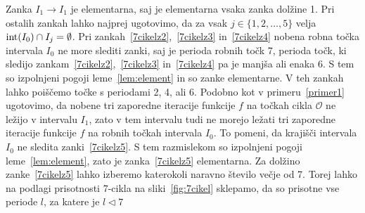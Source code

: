 \documentclass[../TG_magistrsko_delo_sections.tex]{subfiles}
\begin{document}
\begin{primer}[7-cikel]
Zanka $I_1 \to I_1$ je elementarna, saj je elementarna vsaka zanka dolžine 1. Pri ostalih zankah lahko najprej ugotovimo, da za vsak $j \in \{1, 2, \dots, 5\}$ velja $\operatorname{int}(I_0) \cap I_j = \emptyset$. Pri zankah~\ref{7cikelz2},~\ref{7cikelz3} in~\ref{7cikelz4} nobena robna točka intervala $I_0$ ne more slediti zanki, saj je perioda robnih točk 7, perioda točk, ki sledijo zankam~\ref{7cikelz2},~\ref{7cikelz3} in~\ref{7cikelz4} pa je manjša ali enaka 6. S tem so izpolnjeni pogoji leme~\ref{lem:element} in so zanke elementarne. V teh zankah lahko poiščemo točke s periodami 2, 4, ali 6. Podobno kot v primeru~\ref{primer1} ugotovimo, da nobene tri zaporedne iteracije funkcije $f$ na točkah cikla $\mathcal{O}$ ne ležijo v intervalu $I_1$, zato v tem intervalu tudi ne morejo ležati tri zaporedne iteracije funkcije $f$ na robnih točkah intervala $I_0$. To pomeni, da krajišči intervala $I_0$ ne sledita zanki~\ref{7cikelz5}. S tem razmislekom so izpolnjeni pogoji leme~\ref{lem:element}, zato je zanka~\ref{7cikelz5} elementarna. Za dolžino zanke~\ref{7cikelz5} lahko izberemo katerokoli naravno število večje od 7. Torej lahko na podlagi prisotnosti 7-cikla na sliki~\ref{fig:7cikel} sklepamo, da so prisotne vse periode $l$, za katere je $l \triangleleft 7$
\end{primer}
\end{document}
